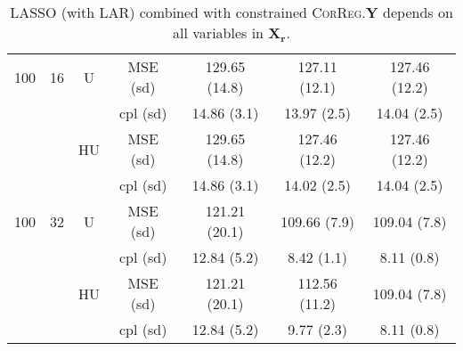 \documentclass[11pt,a4paper]{article}
\begin{document}
\begin{table}[h!]
\begin{tabular}{|c|c|c|c|c|c|c|}
\hline
\hline %
100 & 16 & U& MSE (sd) & 129.65 (14.8) & 127.11 (12.1) & 127.46 (12.2) \\
& & &  cpl (sd) & 14.86 (3.1) & 13.97 (2.5) & 14.04 (2.5) \\
 &  &HU &  MSE (sd) & 129.65 (14.8) & 127.46 (12.2) & 127.46 (12.2) \\
& & & cpl (sd) & 14.86 (3.1) & 14.02 (2.5) & 14.04 (2.5) \\
\hline %
100 & 32 & U&  MSE (sd) & 121.21 (20.1) & 109.66 (7.9) & 109.04 (7.8) \\
& & & cpl (sd) & 12.84 (5.2) & 8.42 (1.1) & 8.11 (0.8) \\
 &  &HU &  MSE (sd) & 121.21 (20.1) & 112.56 (11.2) & 109.04 (7.8) \\
& & & cpl (sd) & 12.84 (5.2) & 9.77 (2.3) & 8.11 (0.8) \\
\hline
\end{tabular} 
\caption{LASSO (with LAR) combined with constrained \textsc{CorReg}.$\boldsymbol{Y}$  depends on all variables in $\boldsymbol{X_r}$. }\label{YX2linLASSO}
\end{table}
\end{document}
